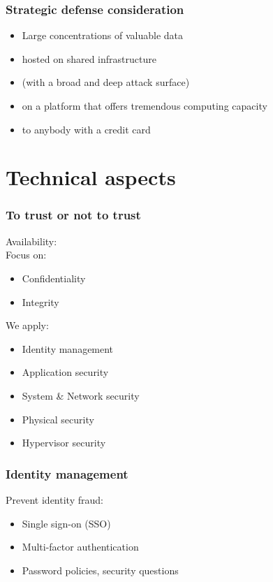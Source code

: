 \documentclass{beamer}
\begin{document}
\begin{frame}
    \frametitle{Strategic defense consideration}
    \begin{itemize}
      \item Large concentrations of valuable data
      \item hosted on shared infrastructure
      \item (with a broad and deep attack surface)
      \item on a platform that offers tremendous computing capacity
      \item to anybody with a credit card
    \end{itemize}
\end{frame}

\section{Technical aspects}
\begin{frame}
    \frametitle{To trust or not to trust}

    Availability: \checkmark \\
    Focus on:
    \begin{itemize}
      \item Confidentiality
      \item Integrity
    \end{itemize}
    We apply:
    \begin{itemize} %
      \item Identity management
      \item Application security
      \item System \& Network security
      \item Physical security
      \item Hypervisor security
    \end{itemize}
\end{frame}

\begin{frame}
    \frametitle{Identity management}
    Prevent identity fraud:
    \begin{itemize}
      \item Single sign-on (SSO) %
      \item Multi-factor authentication
      \item Password policies, security questions
    \end{itemize}
\end{frame}
\end{document}
